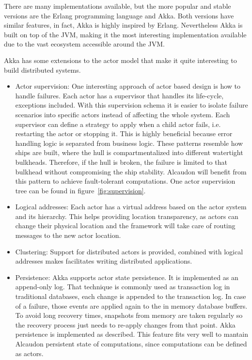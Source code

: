 There are many implementations available\cite{wikiactor}, but the more popular
and stable versions are the Erlang programming language and Akka. Both versions
have similar features, in fact, Akka is highly inspired by Erlang. Nevertheless
Akka is built on top of the JVM, making it the most interesting implementation
available due to the vast ecosystem accessible around the JVM.

Akka has some extensions to the actor model that make it quite interesting to
build distributed systems.
\begin{itemize}
\item Actor supervision: One interesting approach of actor based design is how
  to handle failures. Each actor has a supervisor that handles its life-cycle,
  exceptions included. With this supervision schema it is easier to isolate failure
  scenarios into specific actors instead of affecting the whole system. Each
  supervisor can define a strategy to apply when a child actor fails, i.e.
  restarting the actor or stopping it. This is highly beneficial because error
  handling logic is separated from business logic. These patterns resemble how
  ships are built, where the hull is compartmentalized into different watertight
  bulkheads. Therefore, if the hull is broken, the failure is limited to that
  bulkhead without compromising the ship stability. Alcaudon will benefit from
  this pattern to achieve fault-tolerant computations. One actor supervision
  tree can be found in figure~\ref{fig:supervision}.
\item Logical addresses: Each actor has a virtual address based on the actor
  system and its hierarchy. This helps providing location transparency, as
  actors can change their physical location and the framework will take care of
  routing messages to the new actor location.
\item Clustering: Support for distributed actors is provided, combined with
  logical addresses makes facilitates writing distributed applications.
\item Persistence: Akka supports actor state persistence. It is implemented as
  an append-only log. That technique is commonly used as transaction log in
  traditional databases, each change is appended to the transaction log. In case
  of a failure, those events are applied again to the in memory database
  buffers. To avoid long recovery times, snapshots from memory are taken
  regularly so the recovery process just needs to re-apply changes from that
  point. Akka persistence is implemented as described. This feature fits very
  well to mantain Alcaudon persistent state of computations, since computations
  can be defined as actors.
\end{itemize}

